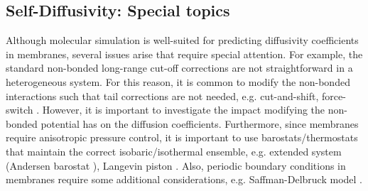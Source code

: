 \documentclass[9pt,bestpractices]{livecoms}
\begin{document}

\subsection{Self-Diffusivity: Special topics} \label{sec:Self-Diffusivity Special topics}

Although molecular simulation is well-suited for predicting diffusivity coefficients in membranes, several issues arise that require special attention. For example, the standard non-bonded long-range cut-off corrections are not straightforward in a heterogeneous system. For this reason, it is common to modify the non-bonded interactions such that tail corrections are not needed, e.g. cut-and-shift, force-switch \cite{GROMACS}. However, it is important to investigate the impact modifying the non-bonded potential has on the diffusion coefficients. Furthermore, since membranes require anisotropic pressure control, it is important to use barostats/thermostats that maintain the correct isobaric/isothermal ensemble, e.g. extended system (Andersen barostat \cite{Andersen1980}), Langevin piston \cite{Feller1995}. Also, periodic boundary conditions in membranes require some additional considerations, e.g. Saffman-Delbruck model \cite{Camley2015,Venable2017}.  
\end{document}
